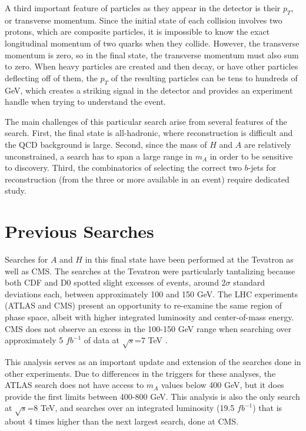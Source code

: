 A third important feature of particles as they appear in the detector is their $p_T$, 
or transverse momentum.  Since the initial state of each collision involves two protons, 
which are composite particles, it is impossible to know the exact longitudinal momentum of 
two quarks when they collide.  However, the transverse momentum is zero, so 
in the final state, the transverse momentum must also sum to zero.  When 
heavy particles are created and then decay, or have other particles deflecting off of 
them, the $p_T$ of the resulting particles can be tens 
to hundreds of GeV, which creates a striking signal in the detector and provides 
an experiment handle when trying to understand the event.

The main challenges of this particular search arise from several features of the search.  
First, the final state is all-hadronic, where reconstruction is difficult and 
the QCD background is large.  Second, since the mass of $H$ 
and $A$ are relatively unconstrained, a search has to span a large 
range in $m_A$ in order to be sensitive to discovery.  
Third, the combinatorics of selecting the correct two $b$-jets for reconstruction 
(from the three or more available in an event) require dedicated study.  


\section{Previous Searches}
Searches for $A$ and $H$ in this final state have been performed at the Tevatron
as well as CMS.  The searches at the 
Tevatron were particularly tantalizing because both CDF \cite{CDFbH} and D0 \cite{D0bH} spotted 
slight excesses of events, around 2$\sigma$ standard deviations each, between approximately
100 and 150 GeV.  The LHC experiments (ATLAS and CMS) present an opportunity to
re-examine the same region of phase space, albeit with higher integrated luminosity
and center-of-mass energy.  CMS does not observe an excess in the 100-150 GeV range 
when searching over approximately 5 $fb^{-1}$ of data at $\sqrt{s}$=7 TeV \cite{CMSbH}.

This analysis serves as an important update and extension of the searches done
in other experiments.  Due to differences in the triggers for these analyses,
the ATLAS search does not have access to $m_A$ values below 400 GeV, but it does 
provide the first limits between 400-800 GeV.  This analysis is also the only
search at $\sqrt{s}$=8 TeV, and searches over an integrated luminosity (19.5 $fb^{-1}$)
that is about 4 times higher than the next largest search, done at CMS.


 






